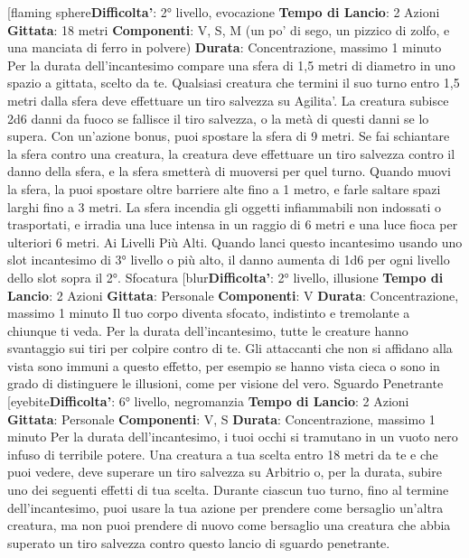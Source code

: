 \begin{multicols}{2}
[flaming sphere\textbf{Difficolta'}:
2° livello, evocazione
\textbf{Tempo di Lancio}: 2 Azioni
\textbf{Gittata}: 18 metri
\textbf{Componenti}: V, S, M (un po’ di sego, un pizzico di
zolfo, e una manciata di ferro in polvere)
\textbf{Durata}: Concentrazione, massimo 1 minuto
Per la durata dell’incantesimo compare una sfera di 1,5
metri di diametro in uno spazio a gittata, scelto da te.
Qualsiasi creatura che termini il suo turno entro 1,5
metri dalla sfera deve effettuare un tiro salvezza su
Agilita'. La creatura subisce 2d6 danni da fuoco se
fallisce il tiro salvezza, o la metà di questi danni se lo
supera.
Con un’azione bonus, puoi spostare la sfera di 9 metri.
Se fai schiantare la sfera contro una creatura, la
creatura deve effettuare un tiro salvezza contro il danno
della sfera, e la sfera smetterà di muoversi per quel
turno.
Quando muovi la sfera, la puoi spostare oltre barriere
alte fino a 1 metro, e farle saltare spazi larghi fino a 3
metri. La sfera incendia gli oggetti infiammabili non
indossati o trasportati, e irradia una luce intensa in un
raggio di 6 metri e una luce fioca per ulteriori 6 metri.
Ai Livelli Più Alti. Quando lanci questo incantesimo
usando uno slot incantesimo di 3° livello o più alto, il
danno aumenta di 1d6 per ogni livello dello slot sopra il
2°.
Sfocatura
[blur\textbf{Difficolta'}:
2° livello, illusione
\textbf{Tempo di Lancio}: 2 Azioni
\textbf{Gittata}: Personale
\textbf{Componenti}: V
\textbf{Durata}: Concentrazione, massimo 1 minuto
Il tuo corpo diventa sfocato, indistinto e tremolante a
chiunque ti veda. Per la durata dell’incantesimo, tutte le
creature hanno svantaggio sui tiri per colpire contro di
te. Gli attaccanti che non si affidano alla vista sono
immuni a questo effetto, per esempio se hanno vista
cieca o sono in grado di distinguere le illusioni, come
per visione del vero.
Sguardo Penetrante
[eyebite\textbf{Difficolta'}:
6° livello, negromanzia
\textbf{Tempo di Lancio}: 2 Azioni
\textbf{Gittata}: Personale
\textbf{Componenti}: V, S
\textbf{Durata}: Concentrazione, massimo 1 minuto
Per la durata dell’incantesimo, i tuoi occhi si tramutano
in un vuoto nero infuso di terribile potere. Una creatura
a tua scelta entro 18 metri da te e che puoi vedere,
deve superare un tiro salvezza su Arbitrio o, per la
durata, subire uno dei seguenti effetti di tua scelta.
Durante ciascun tuo turno, fino al termine
dell’incantesimo, puoi usare la tua azione per prendere
come bersaglio un’altra creatura, ma non puoi prendere
di nuovo come bersaglio una creatura che abbia
superato un tiro salvezza contro questo lancio di
sguardo penetrante.

\end{multicols}
